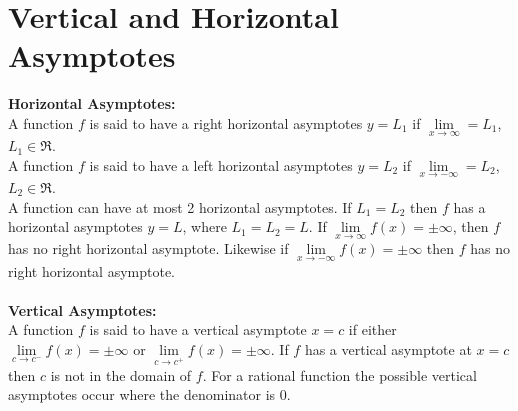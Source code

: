 \documentclass[14pt]{article}
\begin{document}
    \section{Vertical and Horizontal Asymptotes}
    \textbf{Horizontal Asymptotes:}\\
    A function $f$ is said to have a right horizontal asymptotes $y=L_1$
    if $\lim \limits_{x\rightarrow\infty}=L_1$, $L_1\in\Re$.\\
    A function $f$ is said to have a left horizontal asymptotes $y=L_2$
    if $\lim \limits_{x\rightarrow-\infty}=L_2$, $L_2\in\Re$.\\
    A function can have at most 2 horizontal asymptotes. If $L_1=L_2$
    then $f$ has a horizontal asymptotes $y=L$, where $L_1=L_2=L$. If
    $\lim\limits_{x\rightarrow\infty}f(x)=\pm\infty$, then $f$ has no
    right horizontal asymptote. Likewise if
    $\lim\limits_{x\rightarrow-\infty}f(x)=\pm\infty$ then $f$ has no
    right horizontal asymptote.\\\\
    \textbf{Vertical Asymptotes:}\\
    A function $f$ is said to have a vertical asymptote $x=c$ if either
    $\lim\limits_{c\rightarrow c^-}f(x)=\pm\infty$ or
    $\lim\limits_{c\rightarrow c^+}f(x)=\pm\infty$. If $f$ has a
    vertical asymptote at $x=c$ then $c$ is not in the domain of $f$.
    For a rational function the possible vertical asymptotes occur where
    the denominator is 0.
\end{document}

